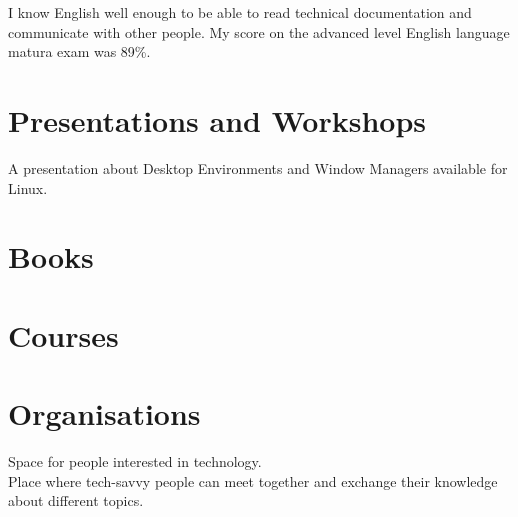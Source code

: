 \documentclass[11pt, a4paper, sans, colorlinks]{moderncv}
\begin{document}
{I know English well enough to be able to read technical documentation and communicate with other people. My score on the advanced level English language matura exam was 89\%. }


\section{Presentations and Workshops}

{}{}
{A presentation about Desktop Environments and Window Managers available for Linux.}

\section{Books}

\section{Courses}


\section{Organisations}

{
Space for people interested in technology.\\
Place where tech-savvy people can meet together and exchange their knowledge about different topics.
}
\end{document}
